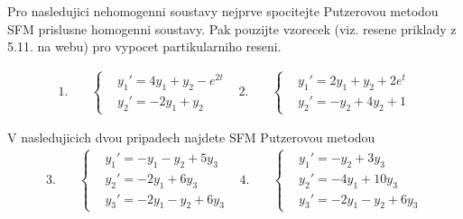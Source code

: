  
Pro nasledujici nehomogenni soustavy nejprve spocitejte 
Putzerovou metodou SFM prislusne homogenni soustavy. Pak
pouzijte vzorecek (viz. resene priklady z 5.11. na webu) 
pro vypocet partikularniho reseni.

\begin{align*}
   1.&\quad
   \left\{
   \begin{aligned}
     &y_1'=4y_1+y_2-e^{2t}\\
     &y_2'=-2y_1+y_2
   \end{aligned}\right.
   &
   2.&\quad
   \left\{
   \begin{aligned}
     &y_1'=2y_1+y_2+2e^t\\
     &y_2'=-y_2+4y_2+1
   \end{aligned}\right.
\end{align*}

V nasledujicich dvou pripadech najdete SFM Putzerovou metodou
\begin{align*}
   3.&\quad
   \left\{
   \begin{aligned}
     &y_1'=-y_1-y_2+5y_3\\
     &y_2'=-2y_1+6y_3\\
     &y_3'=-2y_1-y_2+6y_3
   \end{aligned}\right.
   &
   4.&\quad
   \left\{
   \begin{aligned}
     &y_1'=-y_2+3y_3\\
     &y_2'=-4y_1+10y_3\\
     &y_3'=-2y_1-y_2+6y_3
   \end{aligned}\right.
\end{align*}




